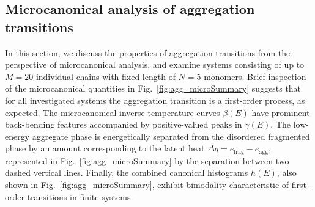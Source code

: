 \documentclass[12pt]{report}
\begin{document}
\subsection{Microcanonical analysis of aggregation transitions}
%
In this section, we discuss the properties of aggregation transitions from the perspective of microcanonical analysis, and examine systems consisting of up to $M = 20$ individual chains with fixed length of $N = 5$ monomers. Brief inspection of the microcanonical quantities in Fig.~\ref{fig:agg_microSummary} suggests that for all investigated systems the aggregation transition is a first-order process, as expected. The microcanonical inverse temperature curves $\beta(E)$ have prominent back-bending features accompanied by positive-valued peaks in $\gamma(E)$. The low-energy aggregate phase is energetically separated from the disordered fragmented phase by an amount corresponding to the latent heat $\Delta q = e_{\mathrm{frag}} - e_{\mathrm{agg}}$, represented in Fig.~\ref{fig:agg_microSummary} by the separation between two dashed vertical lines. Finally, the combined canonical histograms $h(E)$, also shown in Fig.~\ref{fig:agg_microSummary}, exhibit bimodality characteristic of first-order transitions in finite systems.
%
\end{document}
